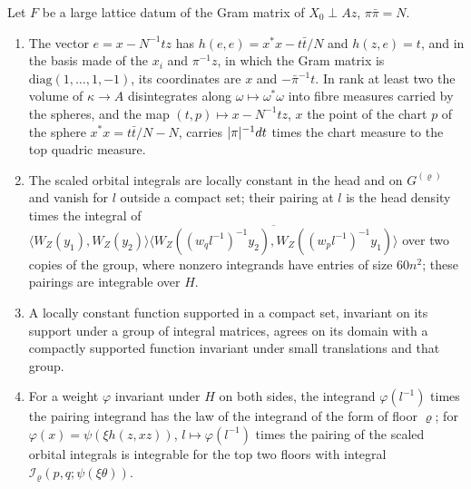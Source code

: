 
\begin{lemma}\label{lem:top-tools}
Let $F$ be a large lattice datum of the Gram matrix of $X_0\perp Az$, $\pi\bar\pi=N$.
\begin{enumerate}[label=\textup{(\alph*)}]
\item The vector $e=x-N^{-1}tz$ has $h(e,e)=x^*x-t\bar t/N$ and $h(z,e)=t$, and in the basis made of the $x_i$ and $\pi^{-1}z$, in which the Gram matrix is $\mathrm{diag}(1,\dots,1,-1)$, its coordinates are $x$ and $-\bar\pi^{-1}t$. In rank at least two the
volume of $\kappa\to A$ disintegrates along $\omega\mapsto\omega^*\omega$ into fibre measures carried by the spheres, and the map $(t,p)\mapsto x-N^{-1}tz$, $x$ the point of the chart $p$ of the sphere $x^*x=t\bar t/N-N$, carries $\lvert \pi\rvert^{-1}dt$ times
the chart measure to the top quadric measure.
\item The scaled orbital integrals are locally constant in the head and on $G^{(\varrho)}$ and vanish for $l$ outside a compact set; their pairing at $l$ is the head density times the integral of
$\langle W_Z(y_1),W_Z(y_2)\rangle\overline{\langle W_Z((w_ql^{-1})^{-1}y_2),W_Z((w_pl^{-1})^{-1}y_1)\rangle}$ over two copies of the group, where nonzero integrands have entries of size $60n^2$; these pairings are integrable over $H$.
\item A locally constant function supported in a compact set, invariant on its support under a group of integral matrices, agrees on its domain with a compactly supported function invariant under small translations and that group.
\item For a weight $\varphi$ invariant under $H$ on both sides, the integrand $\varphi(l^{-1})$ times the pairing integrand has the law of the integrand of the form of floor $\varrho$; for $\varphi(x)=\psi(\xi h(z,xz))$, $l\mapsto\varphi(l^{-1})$ times the pairing of the scaled
orbital integrals is integrable for the top two floors with integral $\mathcal I_\varrho(p,q;\psi(\xi\theta))$.
\end{enumerate}
\end{lemma}

